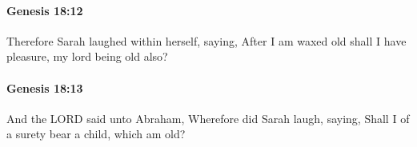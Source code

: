 		\paragraph{Genesis 18:12} %
			\label{GENESIS-18-12}

			Therefore Sarah laughed within herself, saying, After I am waxed old shall I have pleasure, my lord being old also?


		\paragraph{Genesis 18:13} %
			\label{GENESIS-18-13}

			And the LORD said unto Abraham, Wherefore did Sarah laugh, saying, Shall I of a surety bear a child, which am old?


